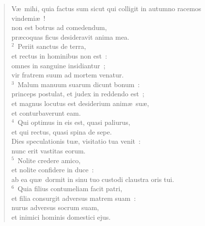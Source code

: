 \begin{flushleft}\begin{verse}\vspace{-19pt}V\ae\ mihi, quia factus sum sicut qui colligit in autumno racemos vindemi\ae~!\\ non est botrus ad comedendum,\\ pr\ae coquas ficus desideravit anima mea.\\
${}^{2}$~Periit sanctus de terra,\\ et rectus in hominibus non est~:\\ omnes in sanguine insidiantur~;\\ vir fratrem suum ad mortem venatur.\\
${}^{3}$~Malum manuum suarum dicunt bonum~:\\ princeps postulat, et judex in reddendo est~;\\ et magnus locutus est desiderium anim\ae\ su\ae ,\\ et conturbaverunt eam.\\
${}^{4}$~Qui optimus in eis est, quasi paliurus,\\ et qui rectus, quasi spina de sepe.\\ Dies speculationis tu\ae , visitatio tua venit~:\\ nunc erit vastitas eorum.\\
${}^{5}$~Nolite credere amico,\\ et nolite confidere in duce~:\\ ab ea qu\ae\ dormit in sinu tuo custodi claustra oris tui.\\
${}^{6}$~Quia filius contumeliam facit patri,\\ et filia consurgit adversus matrem suam~:\\ nurus adversus socrum suam,\\ et inimici hominis domestici ejus.\end{verse}\end{flushleft}


